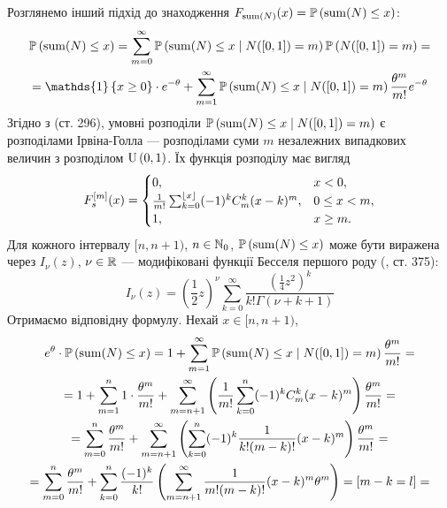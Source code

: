 Розглянемо інший підхід до знаходження $F_{\Sum(N)}(x) = \P{\Sum(N) \leq x}$:
\begin{gather*}
    \P{\Sum(N) \leq x} = 
    \sum_{m=0}^{\infty} \P{\Sum(N) \leq x \mid N([0, 1]) = m} \P{N([0, 1]) = m}
    = \\ = \mathds{1}\left\{x\geq 0\right\}\cdot e^{-\theta} +
    \sum_{m=1}^{\infty} \P{\Sum(N) \leq x \mid N([0, 1]) = m} \frac{\theta^m}{m!} e^{-\theta}
\end{gather*}
Згідно з \cite{ContUnivDistr} (ст. 296), умовні розподіли 
$\P{\Sum(N) \leq x \mid N([0, 1]) = m}$
є розподілами Ірвіна-Голла --- розподілами 
суми $m$ незалежних випадкових величин з розподілом $\Unif{0, 1}$. Їх
функція розподілу має вигляд
\begin{gather*}
    F_s^{[m]} (x) = \begin{cases}
        0, & x < 0, \\
        \frac{1}{m!}\sum_{k=0}^{\floor*{x}} (-1)^k C_m^k (x-k)^m, & 0 \leq x < m, \\
        1, & x \geq m.
    \end{cases}
\end{gather*}
Для кожного інтервалу $[n, n+1)$, $n\in \N_0$, 
$\P{\Sum(N) \leq x}$  може бути виражена через $I_{\nu}(z)$, $\nu \in \R$  ---
модифіковані функції Бесселя першого роду (\cite{Abramowitz_Stegun}, ст. 375):
\begin{equation*}
    I_{\nu}(z) = \left(\frac{1}{2} z\right)^{\nu}
    \sum_{k=0}^{\infty} \frac{
        \left(\frac{1}{4} z^2 \right)^{k}
    }{
        k! \Gamma(\nu + k + 1)
    }
\end{equation*}
Отримаємо відповідну формулу. Нехай $x \in [n, n+1)$,
\begin{gather*}
    e^{\theta} \cdot \P{\Sum(N) \leq x} = 
    1 + \sum_{m=1}^{\infty} \P{\Sum(N) \leq x \mid N([0, 1]) = m} \frac{\theta^m}{m!} = \\ =
    1 + \sum_{m=1}^{n} 1 \cdot \frac{\theta^m}{m!} + 
    \sum_{m=n+1}^{\infty} \left(
        \frac{1}{m!}\sum_{k=0}^{n} (-1)^k C_m^k (x-k)^m
    \right) \frac{\theta^m}{m!} = \\ =
    \sum_{m=0}^{n} \frac{\theta^m}{m!} + 
    \sum_{m=n+1}^{\infty} \left(
        \sum_{k=0}^{n} (-1)^k \frac{1}{k! (m-k)!} (x-k)^m
    \right) \frac{\theta^m}{m!} = \\ =
    \sum_{m=0}^{n} \frac{\theta^m}{m!} + 
    \sum_{k=0}^{n} \frac{(-1)^k}{k!} \left(
        \sum_{m=n+1}^{\infty} \frac{1}{m! (m-k)!} (x - k)^m \theta^m
    \right) = \left[m - k = l \right] = 
\end{gather*}
